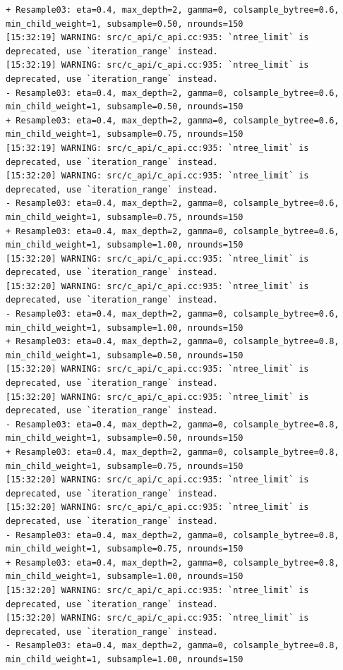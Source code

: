 \documentclass[
  letterpaper,
  DIV=11,
  numbers=noendperiod]{scrartcl}
\begin{document}
\begin{verbatim}
+ Resample03: eta=0.4, max_depth=2, gamma=0, colsample_bytree=0.6, min_child_weight=1, subsample=0.50, nrounds=150 
[15:32:19] WARNING: src/c_api/c_api.cc:935: `ntree_limit` is deprecated, use `iteration_range` instead.
[15:32:19] WARNING: src/c_api/c_api.cc:935: `ntree_limit` is deprecated, use `iteration_range` instead.
- Resample03: eta=0.4, max_depth=2, gamma=0, colsample_bytree=0.6, min_child_weight=1, subsample=0.50, nrounds=150 
+ Resample03: eta=0.4, max_depth=2, gamma=0, colsample_bytree=0.6, min_child_weight=1, subsample=0.75, nrounds=150 
[15:32:19] WARNING: src/c_api/c_api.cc:935: `ntree_limit` is deprecated, use `iteration_range` instead.
[15:32:20] WARNING: src/c_api/c_api.cc:935: `ntree_limit` is deprecated, use `iteration_range` instead.
- Resample03: eta=0.4, max_depth=2, gamma=0, colsample_bytree=0.6, min_child_weight=1, subsample=0.75, nrounds=150 
+ Resample03: eta=0.4, max_depth=2, gamma=0, colsample_bytree=0.6, min_child_weight=1, subsample=1.00, nrounds=150 
[15:32:20] WARNING: src/c_api/c_api.cc:935: `ntree_limit` is deprecated, use `iteration_range` instead.
[15:32:20] WARNING: src/c_api/c_api.cc:935: `ntree_limit` is deprecated, use `iteration_range` instead.
- Resample03: eta=0.4, max_depth=2, gamma=0, colsample_bytree=0.6, min_child_weight=1, subsample=1.00, nrounds=150 
+ Resample03: eta=0.4, max_depth=2, gamma=0, colsample_bytree=0.8, min_child_weight=1, subsample=0.50, nrounds=150 
[15:32:20] WARNING: src/c_api/c_api.cc:935: `ntree_limit` is deprecated, use `iteration_range` instead.
[15:32:20] WARNING: src/c_api/c_api.cc:935: `ntree_limit` is deprecated, use `iteration_range` instead.
- Resample03: eta=0.4, max_depth=2, gamma=0, colsample_bytree=0.8, min_child_weight=1, subsample=0.50, nrounds=150 
+ Resample03: eta=0.4, max_depth=2, gamma=0, colsample_bytree=0.8, min_child_weight=1, subsample=0.75, nrounds=150 
[15:32:20] WARNING: src/c_api/c_api.cc:935: `ntree_limit` is deprecated, use `iteration_range` instead.
[15:32:20] WARNING: src/c_api/c_api.cc:935: `ntree_limit` is deprecated, use `iteration_range` instead.
- Resample03: eta=0.4, max_depth=2, gamma=0, colsample_bytree=0.8, min_child_weight=1, subsample=0.75, nrounds=150 
+ Resample03: eta=0.4, max_depth=2, gamma=0, colsample_bytree=0.8, min_child_weight=1, subsample=1.00, nrounds=150 
[15:32:20] WARNING: src/c_api/c_api.cc:935: `ntree_limit` is deprecated, use `iteration_range` instead.
[15:32:20] WARNING: src/c_api/c_api.cc:935: `ntree_limit` is deprecated, use `iteration_range` instead.
- Resample03: eta=0.4, max_depth=2, gamma=0, colsample_bytree=0.8, min_child_weight=1, subsample=1.00, nrounds=150 

\end{verbatim}
\end{document}
